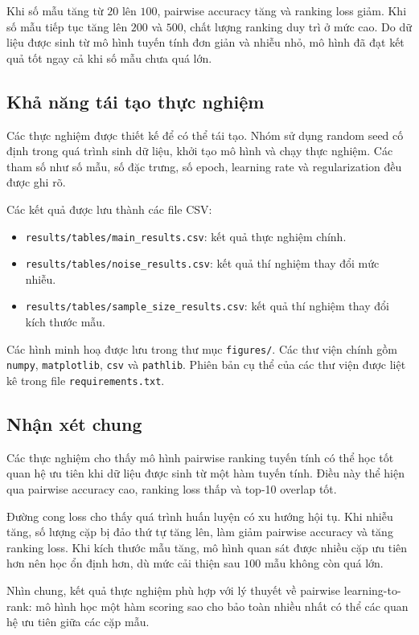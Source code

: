 Khi số mẫu tăng từ \(20\) lên \(100\), pairwise accuracy tăng và ranking loss giảm. Khi số mẫu tiếp tục tăng lên \(200\) và \(500\), chất lượng ranking duy trì ở mức cao. Do dữ liệu được sinh từ mô hình tuyến tính đơn giản và nhiễu nhỏ, mô hình đã đạt kết quả tốt ngay cả khi số mẫu chưa quá lớn.

\subsection{Khả năng tái tạo thực nghiệm}

Các thực nghiệm được thiết kế để có thể tái tạo. Nhóm sử dụng random seed cố định trong quá trình sinh dữ liệu, khởi tạo mô hình và chạy thực nghiệm. Các tham số như số mẫu, số đặc trưng, số epoch, learning rate và regularization đều được ghi rõ.

Các kết quả được lưu thành các file CSV:
\begin{itemize}
    \item \texttt{results/tables/main\_results.csv}: kết quả thực nghiệm chính.
    \item \texttt{results/tables/noise\_results.csv}: kết quả thí nghiệm thay đổi mức nhiễu.
    \item \texttt{results/tables/sample\_size\_results.csv}: kết quả thí nghiệm thay đổi kích thước mẫu.
\end{itemize}

Các hình minh hoạ được lưu trong thư mục \texttt{figures/}. Các thư viện chính gồm \texttt{numpy}, \texttt{matplotlib}, \texttt{csv} và \texttt{pathlib}. Phiên bản cụ thể của các thư viện được liệt kê trong file \texttt{requirements.txt}.

\subsection{Nhận xét chung}

Các thực nghiệm cho thấy mô hình pairwise ranking tuyến tính có thể học tốt quan hệ ưu tiên khi dữ liệu được sinh từ một hàm tuyến tính. Điều này thể hiện qua pairwise accuracy cao, ranking loss thấp và top-10 overlap tốt.

Đường cong loss cho thấy quá trình huấn luyện có xu hướng hội tụ. Khi nhiễu tăng, số lượng cặp bị đảo thứ tự tăng lên, làm giảm pairwise accuracy và tăng ranking loss. Khi kích thước mẫu tăng, mô hình quan sát được nhiều cặp ưu tiên hơn nên học ổn định hơn, dù mức cải thiện sau \(100\) mẫu không còn quá lớn.

Nhìn chung, kết quả thực nghiệm phù hợp với lý thuyết về pairwise learning-to-rank: mô hình học một hàm scoring sao cho bảo toàn nhiều nhất có thể các quan hệ ưu tiên giữa các cặp mẫu.
